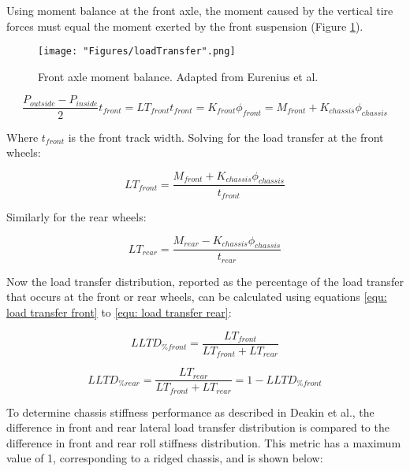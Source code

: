 \documentclass[a4paper]{article}
\numberwithin{equation}{section}
\begin{document}
Using moment balance at the front axle, the moment caused by the vertical tire forces must equal the moment exerted by the front suspension (Figure \ref{fig: load transfer}).

\begin{figure}[h]
	\begin{center}
		\texttt{[image: "Figures/loadTransfer".png]}
	\end{center}
	
	\caption{Front axle moment balance. Adapted from Eurenius et al. \cite{Chalmers}}
	\label{fig: load transfer}
\end{figure}

$$\frac{P_{outside}-P_{inside}}{2}t_{front}=LT_{front}t_{front}=K_{front}\phi_{front}=M_{front}+K_{chassis}\phi_{chassis}$$

Where $t_{front}$ is the front track width. Solving for the load transfer at the front wheels:

\begin{equation}
	LT_{front}=\frac{M_{front}+K_{chassis}\phi_{chassis}}{t_{front}}
	\label{equ: load transfer front}
\end{equation}

Similarly for the rear wheels:

\begin{equation}
	LT_{rear}=\frac{M_{rear}-K_{chassis}\phi_{chassis}}{t_{rear}}
	\label{equ: load transfer rear}
\end{equation}

Now the load transfer distribution, reported as the percentage of the load transfer that occurs at the front or rear wheels, can be calculated using equations \ref{equ: load transfer front} to \ref{equ: load transfer rear}:

\begin{equation}
LLTD_{\%front} = \frac{LT_{front}}{LT_{front}+LT_{rear}}
\label{equ: load transfer dist front}
\end{equation}

\begin{equation}
LLTD_{\%rear} = \frac{LT_{rear}}{LT_{front}+LT_{rear}} = 1 - LLTD_{\%front}
\label{equ: load transfer dist rear}
\end{equation}

To determine chassis stiffness performance as described in Deakin et al., the difference in front and rear lateral load transfer distribution is compared to the difference in front and rear roll stiffness distribution. This metric has a maximum value of 1, corresponding to a ridged chassis, and is shown below:
\end{document}
